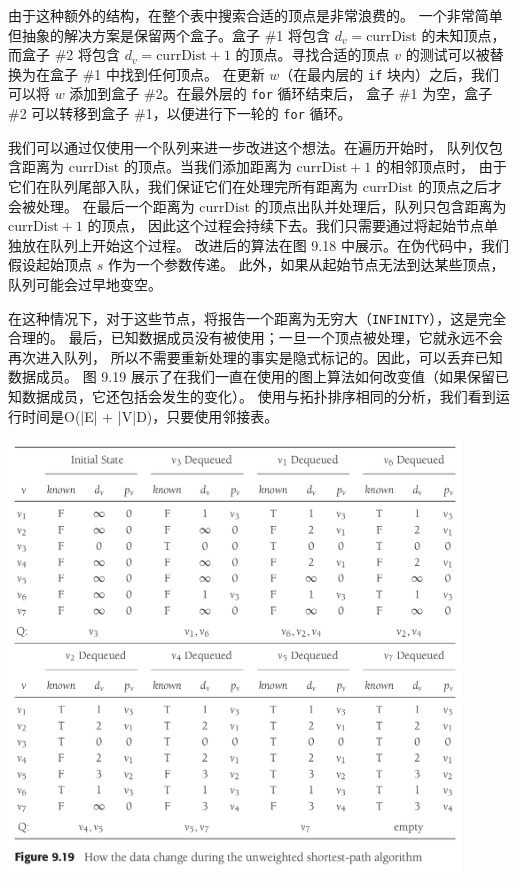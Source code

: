 \documentclass[a4paper]{ctexart}
\theoremstyle{definition}
\theoremstyle{definition}
\begin{document}
由于这种额外的结构，在整个表中搜索合适的顶点是非常浪费的。
一个非常简单但抽象的解决方案是保留两个盒子。盒子 \#1 将包含 $d_v = \mathrm{currDist}$ 的未知顶点，
而盒子 \#2 将包含 $d_v = \mathrm{currDist} + 1$ 的顶点。寻找合适的顶点 $v$ 的测试可以被替换为在盒子 \#1 中找到任何顶点。
在更新 $w$（在最内层的 \verb|if| 块内）之后，我们可以将 $w$ 添加到盒子 \#2。在最外层的 \verb|for| 循环结束后，
盒子 \#1 为空，盒子 \#2 可以转移到盒子 \#1，以便进行下一轮的 \verb|for| 循环。

我们可以通过仅使用一个队列来进一步改进这个想法。在遍历开始时，
队列仅包含距离为 $\mathrm{currDist}$ 的顶点。当我们添加距离为 $\mathrm{currDist} + 1$ 的相邻顶点时，
由于它们在队列尾部入队，我们保证它们在处理完所有距离为 $\mathrm{currDist}$ 的顶点之后才会被处理。
在最后一个距离为 $\mathrm{currDist}$ 的顶点出队并处理后，队列只包含距离为 $\mathrm{currDist} + 1$ 的顶点，
因此这个过程会持续下去。我们只需要通过将起始节点单独放在队列上开始这个过程。
改进后的算法在图 9.18 中展示。在伪代码中，我们假设起始顶点 $s$ 作为一个参数传递。
此外，如果从起始节点无法到达某些顶点，队列可能会过早地变空。

在这种情况下，对于这些节点，将报告一个距离为无穷大（\verb|INFINITY|），这是完全合理的。
最后，已知数据成员没有被使用；一旦一个顶点被处理，它就永远不会再次进入队列，
所以不需要重新处理的事实是隐式标记的。因此，可以丢弃已知数据成员。
图 9.19 展示了在我们一直在使用的图上算法如何改变值（如果保留已知数据成员，它还包括会发生的变化）。
使用与拓扑排序相同的分析，我们看到运行时间是O(|E| + |V|D)，只要使用邻接表。

\begin{center}
  \includegraphics[width=0.9\textwidth]{images/FIG9_19.png}
\end{center}
\end{document}
